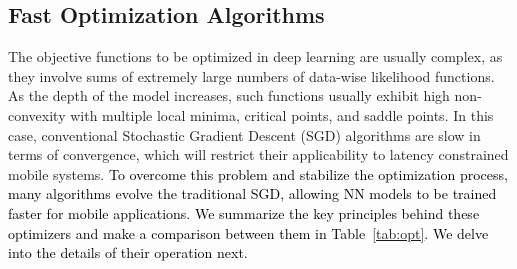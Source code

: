 \documentclass[journal,comsoc,letter]{IEEEtran}
\newcommand{\edit}[1]{\textcolor{black}{#1}}
\begin{document}
\subsection{Fast Optimization Algorithms}\label{set:opt}
The objective functions to be optimized in deep learning are usually complex, as they involve sums of extremely large numbers of data-wise likelihood functions. As the depth of the model increases, such functions usually exhibit high non-convexity with multiple local minima, critical points, and saddle points. In this case, conventional Stochastic Gradient Descent (SGD) algorithms \cite{ruder2016overview} are slow in terms of convergence, which will restrict their applicability to latency constrained mobile systems. \edit{To overcome this problem and stabilize the optimization process, many algorithms evolve the traditional SGD, allowing NN models to be trained faster for mobile applications. We summarize the key principles behind these optimizers and make a comparison between them in Table~\ref{tab:opt}. We delve into the details of their operation next.} 
\end{document}
